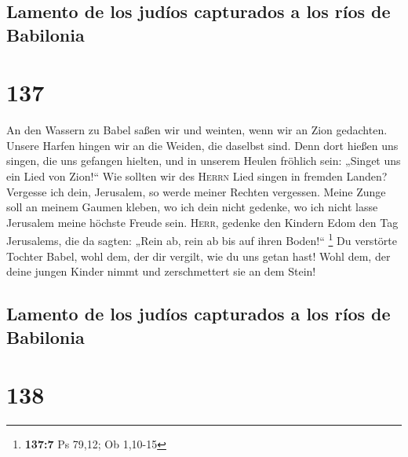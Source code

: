 \hypertarget{lamento-de-los-juduxedos-capturados-a-los-ruxedos-de-babilonia}{%
\subsection{Lamento de los judíos capturados a los ríos de
Babilonia}\label{lamento-de-los-juduxedos-capturados-a-los-ruxedos-de-babilonia}}

\hypertarget{section-136}{%
\section{137}\label{section-136}}

 An den Wassern zu Babel saßen wir und weinten, wenn wir
an Zion gedachten.  Unsere Harfen hingen wir an die
Weiden, die daselbst sind.  Denn dort hießen uns singen,
die uns gefangen hielten, und in unserem Heulen fröhlich sein: „Singet
uns ein Lied von Zion!{}``  Wie sollten wir des
\textsc{Herrn} Lied singen in fremden Landen?  Vergesse
ich dein, Jerusalem, so werde meiner Rechten vergessen. 
Meine Zunge soll an meinem Gaumen kleben, wo ich dein nicht gedenke, wo
ich nicht lasse Jerusalem meine höchste Freude sein. 
\textsc{Herr}, gedenke den Kindern Edom den Tag Jerusalems, die da
sagten: „Rein ab, rein ab bis auf ihren Boden!{}`` \footnote{\textbf{137:7}
  Ps 79,12; Ob 1,10-15}  Du verstörte Tochter Babel, wohl
dem, der dir vergilt, wie du uns getan hast!  Wohl dem,
der deine jungen Kinder nimmt und zerschmettert sie an dem Stein!

\hypertarget{lamento-de-los-juduxedos-capturados-a-los-ruxedos-de-babilonia-1}{%
\subsection{Lamento de los judíos capturados a los ríos de
Babilonia}\label{lamento-de-los-juduxedos-capturados-a-los-ruxedos-de-babilonia-1}}

\hypertarget{section-137}{%
\section{138}\label{section-137}}

